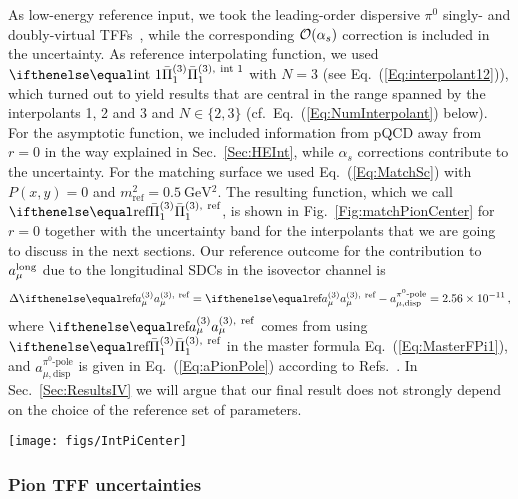 As low-energy reference input, we took the leading-order dispersive $\pi^0$ singly- and doubly-virtual TFFs~\cite{PionTFFshort,PionTFF}, while the corresponding $\mathcal{O}{(\alpha_s)}$ correction is included in the uncertainty. As reference interpolating function, we used $\Pipion[\text{int 1}]$ with $N=3$ (see Eq.~(\ref{Eq:interpolant12})), which turned out to yield results that are central in the range spanned by the interpolants 1, 2 and 3 and $N\in \{2,3\}$ (cf.\ Eq.~(\ref{Eq:NumInterpolant}) below). For the asymptotic function, we included information from pQCD away from $r=0$ in the way explained in Sec.~\ref{Sec:HEInt}, while $\alpha_s$ corrections contribute to the uncertainty. For the matching surface we used Eq.~(\ref{Eq:MatchSc}) with $P(x,y) = 0$ and $m_\text{ref}^2 = \SI{0.5}{\GeV^2}$. The resulting function, which we call $\Pipion[\text{ref}]$, is shown in Fig.~\ref{Fig:matchPionCenter} for $r=0$ together with the uncertainty band for the interpolants that we are going to discuss in the next sections. Our reference outcome for the contribution to $a_\mu^\text{long}$ due to the longitudinal SDCs in the isovector channel is
\begin{equation}
\Delta \aPion[\text{ref}] = \aPion[\text{ref}] - a_{\mu,\text{disp}}^{\pi^0\text{-pole}} = \num{2.56e-11}\,,
\label{Eq:refRes}
\end{equation}
where $\aPion[\text{ref}]$ comes from using $\Pipion[\text{ref}]$ in the master formula Eq.~(\ref{Eq:MasterFPi1}), and 
$a_{\mu,\text{disp}}^{\pi^0\text{-pole}}$ is given in Eq.~(\ref{Eq:aPionPole}) according to Refs.~\cite{PionTFFshort,PionTFF}.
In Sec.~\ref{Sec:ResultsIV} we will argue that our final result does not strongly depend on the choice of the reference set of parameters.

\begin{figure*}
	\centering
	\texttt{[image: figs/IntPiCenter]}

	\caption{The pion pole contribution and associated uncertainty from Refs.~\cite{PionTFFshort,PionTFF} vs. the reference interpolant and its error band which includes all sources of uncertainty considered in the present analysis (see discussion in Secs.~\ref{Sec:NumTFF} -- \ref{Sec:NumMatch} below).}
	\label{Fig:matchPionCenter}
\end{figure*}


\subsubsection{Pion TFF uncertainties}
\label{Sec:NumTFF}

